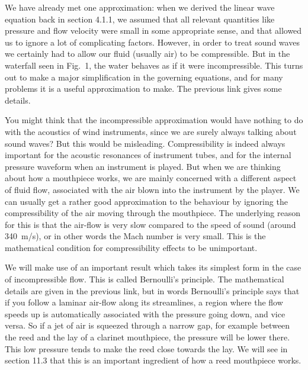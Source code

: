 
  We have already met one approximation: when we derived the linear wave 
  equation back in section 4.1.1, we assumed that all relevant quantities like 
  pressure and flow velocity were small in some appropriate sense, and that 
  allowed us to ignore a lot of complicating factors. However, in order to 
  treat sound waves we certainly had to allow our fluid (usually air) to be 
  compressible. But in the waterfall seen in Fig.\ 1, the water behaves as if 
  it were incompressible. This turns out to make a major simplification in the 
  governing equations, and for many problems it is a useful approximation to 
  make. The previous link gives some details. 

  You might think that the incompressible approximation would have nothing to 
  do with the acoustics of wind instruments, since we are surely always talking 
  about sound waves? But this would be misleading. Compressibility is indeed 
  always important for the acoustic resonances of instrument tubes, and for the 
  internal pressure waveform when an instrument is played. But when we are 
  thinking about how a mouthpiece works, we are mainly concerned with a 
  different aspect of fluid flow, associated with the air blown into the 
  instrument by the player. We can usually get a rather good approximation to 
  the behaviour by ignoring the compressibility of the air moving through the 
  mouthpiece. The underlying reason for this is that the air-flow is very slow 
  compared to the speed of sound (around 340~m/s), or in other words the Mach 
  number is very small. This is the mathematical condition for compressibility 
  effects to be unimportant. 

  We will make use of an important result which takes its simplest form in the 
  case of incompressible flow. This is called Bernoulli’s principle. The 
  mathematical details are given in the previous link, but in words Bernoulli’s 
  principle says that if you follow a laminar air-flow along its streamlines, a 
  region where the flow speeds up is automatically associated with the pressure 
  going down, and vice versa. So if a jet of air is squeezed through a narrow 
  gap, for example between the reed and the lay of a clarinet mouthpiece, the 
  pressure will be lower there. This low pressure tends to make the reed close 
  towards the lay. We will see in section 11.3 that this is an important 
  ingredient of how a reed mouthpiece works. 


